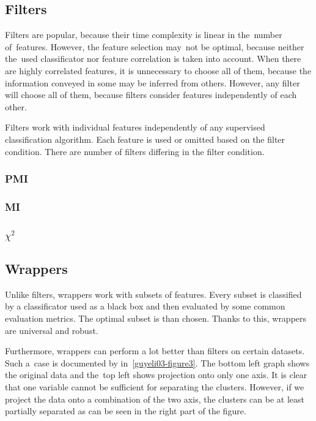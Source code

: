 \subsection{Filters}

Filters are popular, because their time complexity is linear in the~number of~features. However, the feature selection may~not be optimal, because neither the~used classificator nor feature correlation is taken into account. When there are highly correlated features, it is unnecessary to choose all of them, because the information conveyed in some may be inferred from others. However, any filter will choose all of them, because filters consider features independently of each other.

Filters work with individual features independently of any supervised classification algorithm. Each feature is used or omitted based on the filter condition. There are number of filters differing in the filter condition.

\subsubsection{PMI}

\subsubsection{MI}

\subsubsection{$\chi^2$}




\subsection{Wrappers}

Unlike filters, wrappers work with subsets of features. Every subset is classified by a classificator used as a black box and then evaluated by some common evaluation metrics. The optimal subset is than chosen. Thanks to this, wrappers are universal and robust.

Furthermore, wrappers can perform a lot better than filters on certain datasets. Such a~case is documented by \citet{GuyEli03} in~\ref{guyeli03-figure3}. The bottom left graph shows the original data and the~top left shows projection onto only one axis. It is clear that one variable cannot be sufficient for separating the clusters. However, if we project the data onto a combination of the two axis, the clusters can be at least partially separated as can be seen in the right part of the figure.
 

